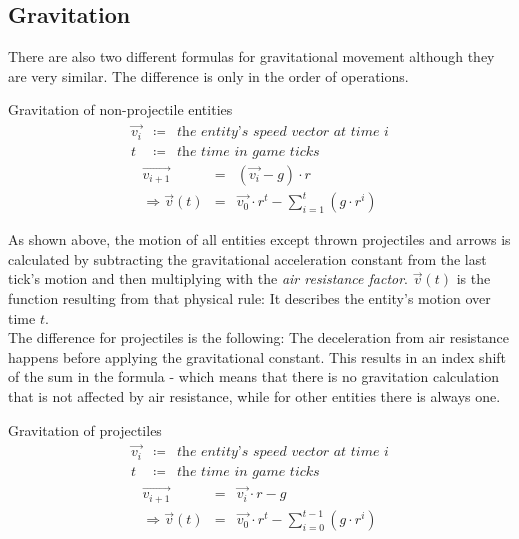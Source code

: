\subsection{Gravitation}

There are also two different formulas for gravitational movement although they are very similar. The difference is only in the order of operations.

\begin{mydef}{Gravitation of non-projectile entities}{
    \begin{eqnarray*}
        \overrightarrow{v_i}    & \coloneqq & \textit{the entity's speed vector at time i} \\
        t                       & \coloneqq & \textit{the time in game ticks}
    \end{eqnarray*}
}
    \begin{eqnarray*}
        \overrightarrow{v_{i + 1}} & = & (\overrightarrow{v_i} - g) \cdot r \\
        \Rightarrow \overrightarrow{v}(t) & = & \overrightarrow{v_0} \cdot r^t - \sum_{i=1}^{t} (g \cdot r^i)
    \end{eqnarray*}
\end{mydef}


As shown above, the motion of all entities except thrown projectiles and arrows is calculated by subtracting the gravitational acceleration constant from the last tick's motion and then multiplying with the \textit{air resistance factor}. $\overrightarrow{v}(t)$ is the function resulting from that physical rule: It describes the entity's motion over time $t$. \\

The difference for projectiles is the following: The deceleration from air resistance happens before applying the gravitational constant. This results in an index shift of the sum in the formula - which means that there is no gravitation calculation that is not affected by air resistance, while for other entities there is always one.

\begin{mydef}{Gravitation of projectiles}{
    \begin{eqnarray*}
        \overrightarrow{v_i}    & \coloneqq & \textit{the entity's speed vector at time i} \\
        t                       & \coloneqq & \textit{the time in game ticks}
    \end{eqnarray*}
}
    \begin{eqnarray*}
        \overrightarrow{v_{i + 1}} & = & \overrightarrow{v_i} \cdot r - g \\
        \Rightarrow \overrightarrow{v}(t) & = & \overrightarrow{v_0} \cdot r^t - \sum_{i=0}^{t - 1} (g \cdot r^i)
    \end{eqnarray*}
\end{mydef}

